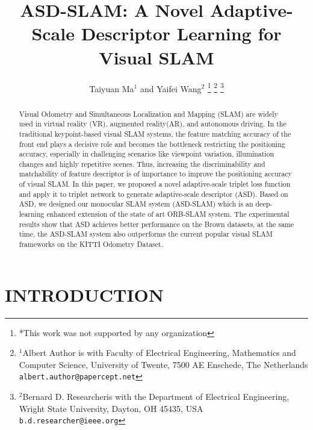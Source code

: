\documentclass[letterpaper, 10 pt, conference]{ieeeconf}  %
\title{\LARGE \bf
ASD-SLAM:  A Novel Adaptive-Scale Descriptor Learning for Visual SLAM 
}
\author{Taiyuan Ma$^{1}$ and Yaifei Wang$^{2}$%
\thanks{*This work was not supported by any organization}%
\thanks{$^{1}$Albert Author is with Faculty of Electrical Engineering, Mathematics and Computer Science,
        University of Twente, 7500 AE Enschede, The Netherlands
        {\tt\small albert.author@papercept.net}}%
\thanks{$^{2}$Bernard D. Researcheris with the Department of Electrical Engineering, Wright State University,
        Dayton, OH 45435, USA
        {\tt\small b.d.researcher@ieee.org}}%
}
\begin{document}
\maketitle
\thispagestyle{empty}
\pagestyle{empty}


\begin{abstract}

Visual Odometry and Simultaneous Localization and Mapping (SLAM) are widely used in virtual reality (VR), augmented reality(AR), and autonomous driving. In the traditional keypoint-based visual SLAM systems, the feature matching accuracy of the front end plays a decisive role and becomes the bottleneck restricting the positioning accuracy, especially in challenging scenarios like viewpoint variation, illumination changes and highly repetitive scenes. Thus, increasing the discriminability and matchability of feature descriptor is of importance to improve the positioning accuracy of visual SLAM.  In this paper, we proposed a novel adaptive-scale triplet loss function and apply it to triplet network to generate adaptive-scale descriptor (ASD). Based on ASD, we designed our monocular SLAM system (ASD-SLAM) which  is an deep-learning enhanced extension of the state of art ORB-SLAM system. The experimental results show that ASD achieves better performance on the Brown datasets, at the same time, the ASD-SLAM system also outperforms the current popular visual SLAM frameworks on the KITTI Odometry Dataset. 
\end{abstract}


\section{INTRODUCTION}
\end{document}
